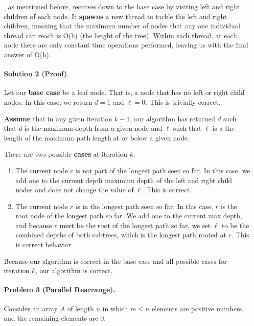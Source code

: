 \documentclass[11pt]{article}
\begin{document}
, as mentioned before, recurses down to the base case by visiting left and right children of each node. It \textbf{spawns} a new thread to tackle the left and right children, meaning that the maximum number of nodes that any one individual thread can reach is O(h) (the height of the tree). Within each thread, at each node there are only constant time operations performed, leaving us with the final answer of O(h).

\paragraph{Solution 2 (Proof)}
Let our \textbf{base case} be a leaf node. That is, a node that has no left or
right child nodes. In this case, we return $d=1$ and $\ell=0$. This is trivially
correct.

\textbf{Assume} that in any given iteration $k-1$, our algorithm has returned 
$d$ such that $d$ is the maximum depth from a given node and $\ell$ such that
$\ell$ is a the length of the maximum path length at or below a given node.

There are two possible \textbf{cases} at iteration $k$.
\begin{enumerate}
    \item The current node $r$ is not part of the longest path seen so far. In
        this case, we add one to the current depth maximum depth of the left
        and right child nodes and does not change the value of $\ell$. This is
        correct.
    \item The current node $r$ is in the longest path seen so far. In this case,
        $r$ is the root node of the longest path so far. We add one to the
        current max depth, and because $r$ must be the root of the longest
        path so far, we set $\ell$ to be the combined depths of both subtrees,
        which is the longest path rooted at $r$. This is correct behavior.
\end{enumerate}
Because our algorithm is correct in the base case and all possible cases for
iteration $k$, our algorithm is correct.

\newpage
\paragraph{Problem 3 (Parallel Rearrange).} Consider an array $A$ of length $n$ in which $m \leq n$ elements are positive numbers, and the remaining elements are 0. 
\end{document}
